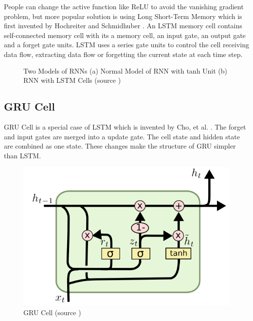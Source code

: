    People can change the active function like ReLU to avoid the vanishing gradient problem, but more popular solution is using Long Short-Term Memory which is first invented by Hochreiter and Schmidhuber \cite{hochreiter1997long}.      
   An LSTM memory cell contains self-connected memory cell with its a memory cell, an input gate, an output gate and a forget gate units. LSTM uses a series gate units to control the cell receiving data flow, extracting data flow or forgetting the current state at each time step. 



\begin{figure}[!h]

  \centering


\caption{Two Models of RNNs (a) Normal Model of RNN with tanh Unit (b) RNN with LSTM Cells (source \cite{olah2015understanding}) }
\label{fig:SISModel}
\end{figure}

\subsection{GRU Cell} %
GRU Cell is a special case of LSTM which is invented by  Cho, et al. \cite{cho2014learning}.  The forget and input gates are merged into a update gate. The cell state and hidden state are combined as one state. These changes make the structure of GRU simpler than LSTM.

\begin{figure}[!h]
\centering
\includegraphics[width=0.55\columnwidth]{images/GRU.png}
\caption{GRU Cell  (source \cite{olah2015understanding})  }
\label{fig:GRU}
\end{figure}

